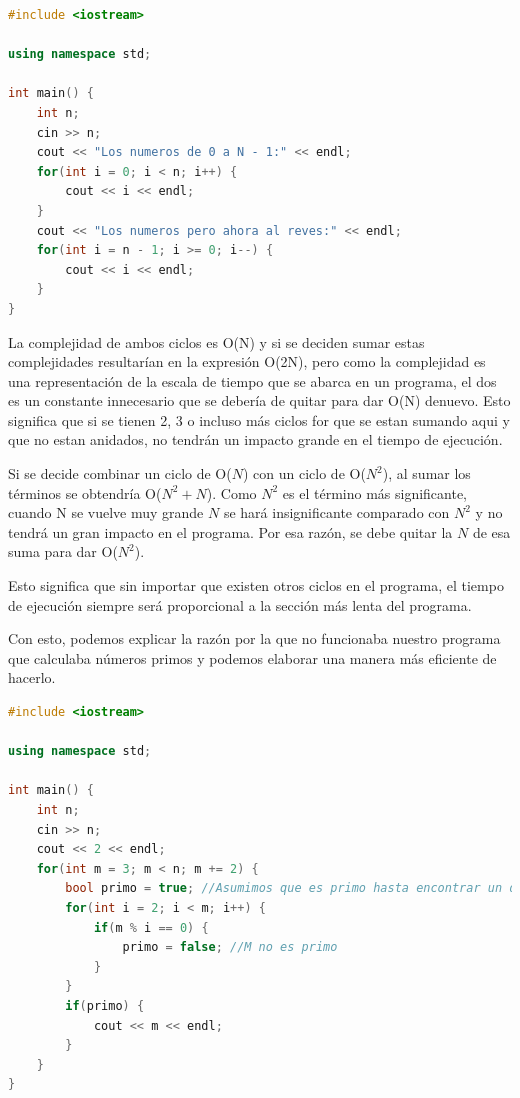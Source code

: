 \documentclass{article}
\begin{document}
\begin{lstlisting}[language=C++, caption=Encontrando primos menores que N]
#include <iostream>

using namespace std;

int main() {
    int n;
    cin >> n;
    cout << "Los numeros de 0 a N - 1:" << endl;
    for(int i = 0; i < n; i++) {
        cout << i << endl;
    }
    cout << "Los numeros pero ahora al reves:" << endl;
    for(int i = n - 1; i >= 0; i--) {
        cout << i << endl;
    }
}
\end{lstlisting}

La complejidad de ambos ciclos es O(N) y si se deciden sumar estas complejidades resultarían en la expresión O(2N), pero como la complejidad es una representación de la escala de tiempo que se abarca en un programa, el dos es un constante innecesario que se debería de quitar para dar O(N) denuevo. Esto significa que si se tienen 2, 3 o incluso más ciclos for que se estan sumando aqui y que no estan anidados, no tendrán un impacto grande en el tiempo de ejecución.

Si se decide combinar un ciclo de O($N$) con un ciclo de O($N^2$), al sumar los términos se obtendría O($N^2 + N$). Como $N^2$ es el término más significante, cuando N se vuelve muy grande $N$ se hará insignificante comparado con $N^2$ y no tendrá un gran impacto en el programa. Por esa razón, se debe quitar la $N$ de esa suma para dar O($N^2$).

Esto significa que sin importar que existen otros ciclos en el programa, el tiempo de ejecución siempre será proporcional a la sección más lenta del programa.

Con esto, podemos explicar la razón por la que no funcionaba nuestro programa que calculaba números primos y podemos elaborar una manera más eficiente de hacerlo.

\begin{lstlisting}[language=C++, caption=¿Optimizando?]
#include <iostream>

using namespace std;

int main() {
    int n;
    cin >> n;
    cout << 2 << endl;
    for(int m = 3; m < n; m += 2) {
        bool primo = true; //Asumimos que es primo hasta encontrar un divisor
        for(int i = 2; i < m; i++) {
            if(m % i == 0) {
                primo = false; //M no es primo
            }
        }
        if(primo) {
            cout << m << endl;
        }
    }
}
\end{lstlisting}
\end{document}
